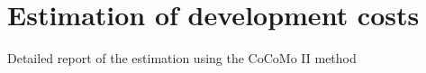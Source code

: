 \section{Estimation of development costs}

\begin{table}[hbtp]
\centering

\caption{Detailed report of the estimation using the CoCoMo II method}
\label{tblCocomoDetail}
\end{table}
